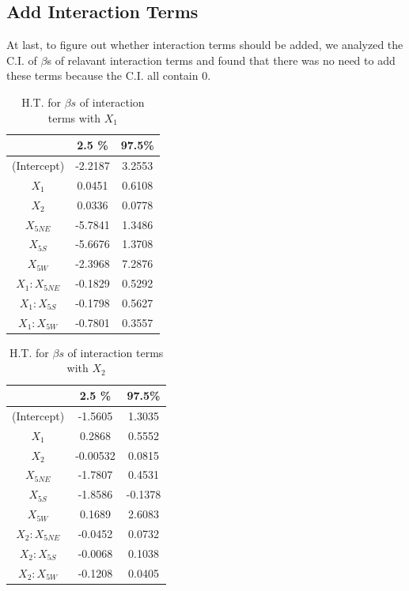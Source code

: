 \documentclass[a4paper,11pt,onecolumn,twoside]{article}
\begin{document}
\subsection{Add Interaction Terms}
At last, to figure out whether interaction terms should be added, we analyzed the C.I. of $\beta$s of relavant interaction terms and found that there was no need to add these terms because the C.I. all contain 0.
\begin{table}[H]
	\centering
	\begin{tabular}{ccc}
		\midrule[1.5pt]	
						&2.5 \% &97.5\% \\
		\hline    
		(Intercept) &-2.2187 &3.2553\\
		$X_1$           &0.0451 &0.6108\\
		$X_2$           &0.0336 &0.0778\\
		$X_{5NE}$        &-5.7841 &1.3486\\
		$X_{5S}$         &-5.6676 &1.3708\\
		$X_{5W}$         &-2.3968 &7.2876\\
		$X_1:X_{5NE}$     &-0.1829 &0.5292\\
		$X_1:X_{5S}$      &-0.1798 &0.5627\\
		$X_1:X_{5W}$      &-0.7801 &0.3557\\
		\midrule[1.5pt]
	\end{tabular}
	\caption{H.T. for $\beta s$ of interaction terms with $X_1$ }
\end{table}
\begin{table}[H]
	\centering
	\begin{tabular}{ccc}
		\midrule[1.5pt]	
		&2.5 \% &97.5\% \\
		\hline    
		(Intercept) &-1.5605  &1.3035\\
		$X_1$          &0.2868  &0.5552\\
		$X_2$          &-0.00532  &0.0815\\
		$X_{5NE}$        &-1.7807  &0.4531\\
		$X_{5S}$         &-1.8586 &-0.1378\\
		$X_{5W}$        & 0.1689  &2.6083\\
		$X_2:X_{5NE}$     &-0.0452  &0.0732\\
		$X_2:X_{5S}$      &-0.0068 &0.1038\\
		$X_2:X_{5W}$      &-0.1208  &0.0405\\
		\midrule[1.5pt]
	\end{tabular}
	\caption{H.T. for $\beta s$ of interaction terms with $X_2$ }
\end{table}
\end{document}
